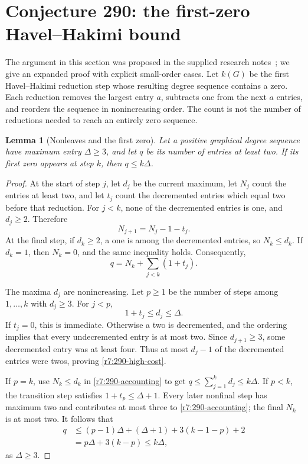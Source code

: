 \documentclass[11pt,a4paper]{article}
\newtheorem{lemma}[theorem]{Lemma}
\theoremstyle{remark}
\begin{document}
\section{Conjecture 290: the first-zero Havel--Hakimi bound}
\label{r7:sec290}

The argument in this section was proposed in the supplied research
notes~\cite{UserNotes}; we give an expanded proof with explicit small-order
cases.  Let $k(G)$ be the first Havel--Hakimi reduction step whose
resulting degree sequence contains a zero.  Each reduction removes the
largest entry $a$, subtracts one from the next $a$ entries, and reorders
the sequence in nonincreasing order.  The count is not the number of
reductions needed to reach an entirely zero sequence.

\begin{lemma}[Nonleaves and the first zero]
\label{r7:290-sequence}
Let a positive graphical degree sequence have maximum entry
$\Delta\ge3$, and let $q$ be its number of entries at least two.
If its first zero appears at step $k$, then $q\le k\Delta$.
\end{lemma}

\begin{proof}
At the start of step $j$, let $d_j$ be the current maximum, let $N_j$
count the entries at least two, and let $t_j$ count the decremented
entries which equal two before that reduction.  For $j<k$, none of
the decremented entries is one, and $d_j\ge2$.  Therefore
\[
 N_{j+1}=N_j-1-t_j.
\]
At the final step, if $d_k\ge2$, a one is among the decremented
entries, so $N_k\le d_k$.  If $d_k=1$, then $N_k=0$, and the same
inequality holds.  Consequently,
\begin{equation}
 q=N_k+\sum_{j<k}(1+t_j).
 \label{r7:290-accounting}
\end{equation}

The maxima $d_j$ are nonincreasing.  Let $p\ge1$ be the number of
steps among $1,\ldots,k$ with $d_j\ge3$.  For $j<p$,
\begin{equation}
 1+t_j\le d_j\le\Delta.
 \label{r7:290-high-cost}
\end{equation}
If $t_j=0$, this is immediate.  Otherwise a two is decremented, and
the ordering implies that every undecremented entry is at most two.
Since $d_{j+1}\ge3$, some decremented entry was at least four.
Thus at most $d_j-1$ of the decremented entries were twos, proving
\eqref{r7:290-high-cost}.

If $p=k$, use $N_k\le d_k$ in \eqref{r7:290-accounting} to get
$q\le\sum_{j=1}^k d_j\le k\Delta$.
If $p<k$, the transition step satisfies $1+t_p\le\Delta+1$.
Every later nonfinal step has maximum two and contributes at most
three to \eqref{r7:290-accounting}; the final $N_k$ is at most two.
It follows that
\[
 \begin{split}
 q&\le(p-1)\Delta+(\Delta+1)+3(k-1-p)+2\\
  &=p\Delta+3(k-p)\le k\Delta,
 \end{split}
\]
as $\Delta\ge3$.
\end{proof}
\end{document}
